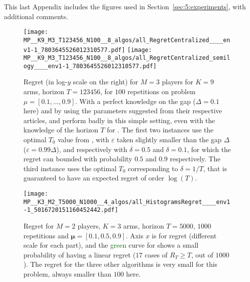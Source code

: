 This last Appendix includes the figures used in Section~\ref{sec:5:experiments},
with additional comments.


\begin{figure}[!h]
    \centering
        \texttt{[image: MP\_\_K9\_M3\_T123456\_N100\_\_8\_algos/all\_RegretCentralized\_\_\_\_env1-1\_7803645526012310577.pdf]}
        \texttt{[image: MP\_\_K9\_M3\_T123456\_N100\_\_8\_algos/all\_RegretCentralized\_semilogy\_\_\_\_env1-1\_7803645526012310577.pdf]}
    \caption[Regret for $M=3$ players for $K=9$ arms, horizon $T=123456$, for $100$ repetitions on a fixed problem]{Regret (in log-$y$ scale on the right) for $M=3$ players for $K=9$ arms, horizon $T=123456$, for $100$ repetitions on problem $\mu=[0.1,\dots,0.9]$. With a perfect knowledge on the gap ($\Delta=0.1$ here) and by using the parameters suggested from their respective articles, \MEGA{} and \MusicalChair{} perform badly in this simple setting, even with the knowledge of the horizon $T$ for \MusicalChair{}. The first two \MusicalChair{} instances use the optimal $T_0$ value from \cite{Rosenski16}, with $\varepsilon$ taken slightly smaller than the gap $\Delta$ ($\varepsilon=0.99 \Delta$), and respectively with $\delta=0.5$ and $\delta=0.1$, for which the regret can bounded with probability $0.5$ and $0.9$ respectively. The third instance uses the optimal $T_0$ corresponding to $\delta=1/T$, that is guaranteed to have an expected regret of order $\log(T)$.}
    \label{fig:5:MP__K9_M3_T123456_N100__8_algos}
\end{figure}

%
%
\begin{figure}[!h]
    \centering
        \texttt{[image: MP\_\_K3\_M2\_T5000\_N1000\_\_4\_algos/all\_HistogramsRegret\_\_\_\_env1-1\_5016720151160452442.pdf]}
    \caption[Failure case of \Selfish]{Regret for $M=2$ players, $K=3$ arms, horizon $T=5000$, $1000$ repetitions and $\boldsymbol{\mu} = [0.1, 0.5, 0.9]$. Axis $x$ is for regret (different scale for each part), and the \textcolor{darkgreen}{green} curve for \Selfish{} shows a small probability of having a linear regret ($17$ cases of $R_T \geq T$, out of $1000$). The regret for the three other algorithms is very small for this problem, always smaller than $100$ here.}
    \label{fig:5:selfish_fail1}
\end{figure}



